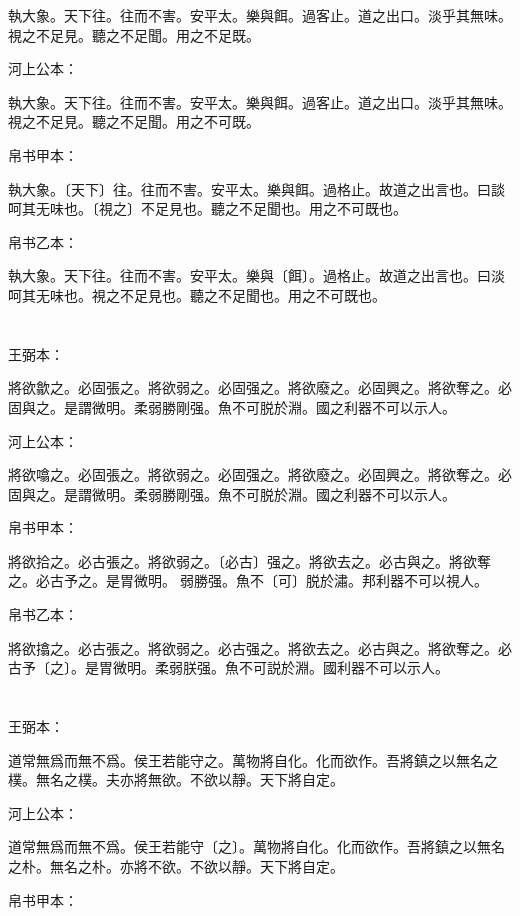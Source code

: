 \documentclass[a5paper]{ctexbook}
\begin{document}
    執大象。天下往。往而不害。安平太。樂與餌。過客止。道之出口。淡乎其無味。視之不足見。聽之不足聞。用之不足既。

    河上公本：

    執大象。天下往。往而不害。安平太。樂與餌。過客止。道之出口。淡乎其無味。視之不足見。聽之不足聞。用之不可既。

    帛书甲本：

    執大象。〔天下〕往。往而不害。安平太。樂與餌。過格止。故道之出言也。曰談呵其无味也。〔視之〕不足見也。聽之不足聞也。用之不可既也。

    帛书乙本：

    執大象。天下往。往而不害。安平太。樂與〔餌〕。過格止。故道之出言也。曰淡呵其无味也。視之不足見也。聽之不足聞也。用之不可既也。

    \chapter{}
    王弼本：

    將欲歙之。必固張之。將欲弱之。必固强之。將欲廢之。必固興之。將欲奪之。必固與之。是謂微明。柔弱勝剛强。魚不可脱於淵。國之利器不可以示人。

    河上公本：

    將欲噏之。必固張之。將欲弱之。必固强之。將欲廢之。必固興之。將欲奪之。必固與之。是謂微明。柔弱勝剛强。魚不可脱於淵。國之利器不可以示人。

    帛书甲本：

    將欲拾之。必古張之。將欲弱之。〔必古〕强之。將欲去之。必古與之。將欲奪之。必古予之。是胃微明。󱁩弱勝强。魚不〔可〕脱於潚。邦利器不可以視人。

    帛书乙本：

    將欲㩉之。必古張之。將欲弱之。必古强之。將欲去之。必古與之。將欲奪之。必古予〔之〕。是胃微明。柔弱朕强。魚不可説於淵。國利器不可以示人。

    \chapter{}
    王弼本：

    道常無爲而無不爲。侯王若能守之。萬物將自化。化而欲作。吾將鎮之以無名之樸。無名之樸。夫亦將無欲。不欲以靜。天下將自定。

    河上公本：

    道常無爲而無不爲。侯王若能守〔之〕。萬物將自化。化而欲作。吾將鎮之以無名之朴。無名之朴。亦將不欲。不欲以靜。天下將自定。

    帛书甲本：
\end{document}
